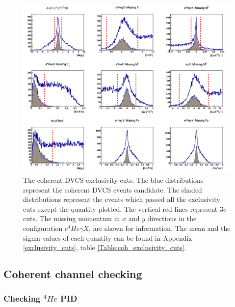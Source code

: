 \begin{figure}[!h]
\centering
\includegraphics[scale=0.4]{fig_dvcs/all_coh_exc_cuts.png}
\caption{The coherent DVCS exclusivity cuts. The blue distributions represent 
   the coherent DVCS events candidate. The shaded distributions represent the 
   events which passed all the exclusivity cuts except the quantity plotted.  
   The vertical red lines represent $3\sigma$ cuts. The missing momentum in $x$ 
   and $y$ directions in the configuration $e^{4}He\gamma X$, are shown for 
information. The mean and the sigma values of each quantity can be found in 
Appendix \ref{exclusivity_cuts}, table \ref{Table:coh_exclusivity_cuts}.} 
\label{fig:coh_exclusivty_cuts}
\end{figure}

\subsection{Coherent channel checking}

\subsubsection{Checking $^{4}He$ PID}

